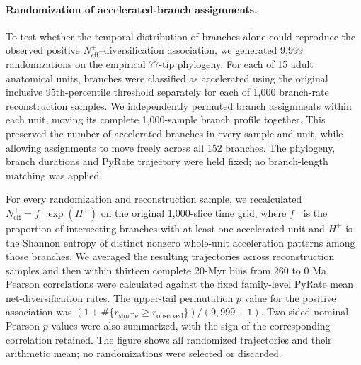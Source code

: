 \paragraph{Randomization of accelerated-branch assignments.}
To test whether the temporal distribution of branches alone could reproduce the observed positive $N_{\mathrm{eff}}^{+}$--diversification association, we generated 9,999 randomizations on the empirical 77-tip phylogeny. For each of 15 adult anatomical units, branches were classified as accelerated using the original inclusive 95th-percentile threshold separately for each of 1,000 branch-rate reconstruction samples. We independently permuted branch assignments within each unit, moving its complete 1,000-sample branch profile together. This preserved the number of accelerated branches in every sample and unit, while allowing assignments to move freely across all 152 branches. The phylogeny, branch durations and PyRate trajectory were held fixed; no branch-length matching was applied.

For every randomization and reconstruction sample, we recalculated $N_{\mathrm{eff}}^{+}=f^{+}\exp(H^{+})$ on the original 1,000-slice time grid, where $f^{+}$ is the proportion of intersecting branches with at least one accelerated unit and $H^{+}$ is the Shannon entropy of distinct nonzero whole-unit acceleration patterns among those branches. We averaged the resulting trajectories across reconstruction samples and then within thirteen complete 20-Myr bins from 260 to 0 Ma. Pearson correlations were calculated against the fixed family-level PyRate mean net-diversification rates. The upper-tail permutation $p$ value for the positive association was $(1+\#\{r_{\mathrm{shuffle}}\geq r_{\mathrm{observed}}\})/(9{,}999+1)$. Two-sided nominal Pearson $p$ values were also summarized, with the sign of the corresponding correlation retained. The figure shows all randomized trajectories and their arithmetic mean; no randomizations were selected or discarded.

